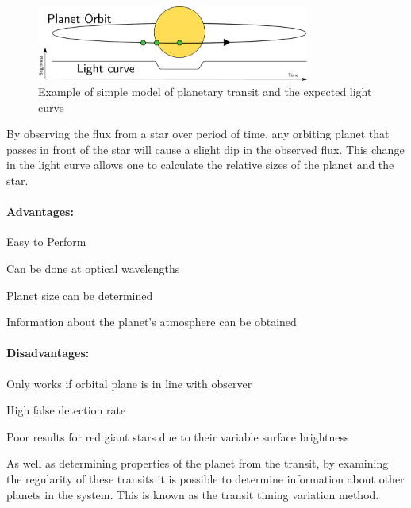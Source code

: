 \begin{figure}[ht]
    \centering
    \includegraphics[width=0.8\textwidth]{images/planetary_transit.pdf}
    \caption{Example of simple model of planetary transit and the expected light curve}
    \label{fig:transit}
\end{figure}

By observing the flux from a star over period of time, any orbiting planet that passes in front of the star will cause a slight dip in the observed flux. This change in the light curve allows one to calculate the relative sizes of the planet and the star.

\paragraph{Advantages:}
\begin{itemize*}
    \item Easy to Perform
    \item Can be done at optical wavelengths
    \item Planet size can be determined
    \item Information about the planet's atmosphere can be obtained \citep{fortney2006atmosphere}
\end{itemize*}

\paragraph{Disadvantages:}
\begin{itemize*}
    \item Only works if orbital plane is in line with observer
    \item High false detection rate \citep{santerne2012sophie}
    \item Poor results for red giant stars due to their variable surface brightness
\end{itemize*}

As well as determining properties of the planet from the transit, by examining the regularity of these transits it is possible to determine information about other planets in the system. This is known as the transit timing variation method.

